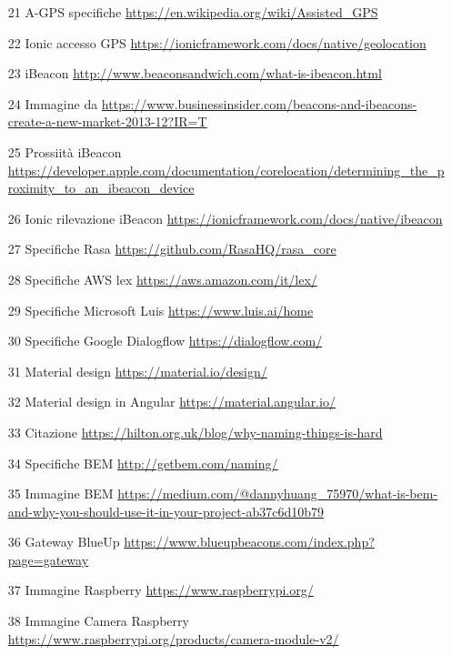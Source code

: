\begin{itemize}
\item [21] A-GPS specifiche \url{https://en.wikipedia.org/wiki/Assisted_GPS}
\item [22] Ionic accesso GPS \url{https://ionicframework.com/docs/native/geolocation}
\item [23] iBeacon \url{http://www.beaconsandwich.com/what-is-ibeacon.html}
\item [24] Immagine da \url{https://www.businessinsider.com/beacons-and-ibeacons-create-a-new-market-2013-12?IR=T}
\item [25] Prossiità iBeacon \url{https://developer.apple.com/documentation/corelocation/determining_the_proximity_to_an_ibeacon_device}
\item [26] Ionic rilevazione iBeacon \url{https://ionicframework.com/docs/native/ibeacon}
\item [27] Specifiche Rasa \url{https://github.com/RasaHQ/rasa_core}
\item [28] Specifiche AWS lex \url{https://aws.amazon.com/it/lex/}
\item [29] Specifiche Microsoft Luis \url{https://www.luis.ai/home}
\item [30] Specifiche Google Dialogflow \url{https://dialogflow.com/}
\item [31] Material design \url{https://material.io/design/}
\item [32] Material design in Angular \url{https://material.angular.io/}
\item [33] Citazione \url{https://hilton.org.uk/blog/why-naming-things-is-hard}
\item [34] Specifiche BEM \url{http://getbem.com/naming/}
\item [35] Immagine BEM \url{https://medium.com/@dannyhuang_75970/what-is-bem-and-why-you-should-use-it-in-your-project-ab37c6d10b79}
\item [36] Gateway BlueUp  \url{https://www.blueupbeacons.com/index.php?page=gateway}
\item [37] Immagine Raspberry \url{https://www.raspberrypi.org/}
\item [38] Immagine Camera Raspberry \url{https://www.raspberrypi.org/products/camera-module-v2/}
\end{itemize}
